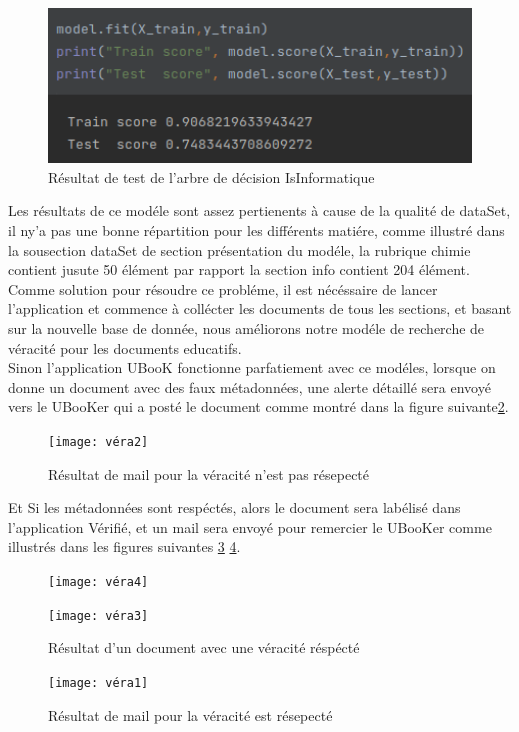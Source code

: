 \documentclass[12pt]{report}
\begin{document}
\begin{figure}[!hbtp]
    \centering
    \includegraphics[width=1\textwidth]{isinfo}
    \caption{Résultat de test de l'arbre de décision IsInformatique}
    \label{000:2}
\end{figure}

Les résultats de ce modéle sont assez pertienents à cause de la qualité de dataSet, il ny'a pas une bonne répartition pour les différents matiére, comme illustré dans la sousection dataSet de section présentation du modéle, la rubrique chimie contient jusute 50 élément par rapport la section info contient 204 élément. \\
Comme solution pour résoudre ce probléme, il est nécéssaire de lancer l'application et commence à collécter les documents de tous les sections, et basant sur la nouvelle base de donnée, nous améliorons notre modéle de recherche de véracité pour les documents educatifs.\\
Sinon l'application UBooK fonctionne parfatiement avec ce modéles, lorsque on donne un document avec des faux métadonnées, une alerte détaillé sera envoyé vers le UBooKer qui a posté le document comme montré dans la figure suivante\ref{000:3}.
\begin{figure}[!hbtp]
    \centering
    \texttt{[image: véra2]}
    \caption{Résultat de mail pour la véracité n'est pas résepecté}
    \label{000:3}
\end{figure}
\newpage
Et Si les métadonnées sont respéctés, alors le document sera labélisé dans l'application Vérifié, et un mail sera envoyé pour remercier le UBooKer comme illustrés dans les figures suivantes  \ref{000:b} \ref{000:c}.
\begin{figure}[!hbtp]
    \centering
    \texttt{[image: véra4]}
\end{figure}
\begin{figure}[!hbtp]
    \centering
    \texttt{[image: véra3]}
    \caption{Résultat d'un document avec une véracité réspécté}
    \label{000:b}
\end{figure}
\begin{figure}[!hbtp]
    \centering
    \texttt{[image: véra1]}
    \caption{Résultat de mail pour la véracité est résepecté}
    \label{000:c}
\end{figure}
\newpage
\end{document}
